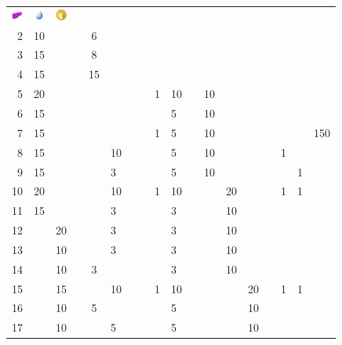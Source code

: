 \begin{table}[t]
\begin{center}
\begin{tabular}{r|g c g c g c g c g c g c g c g c g}
  \includegraphics[width=1em]{images/lure.png} &
  \includegraphics[width=1em]{images/luckyegg.png} &
  \includegraphics[width=1em]{images/pokecoin.png}
    \\
    2 & 10 &    &    &  6 &    &    &    &   &    &    &    &    &    &    &   &   & \\
    3 & 15 &    &    &  8 &    &    &    &   &    &    &    &    &    &    &   &   & \\
    4 & 15 &    &    & 15 &    &    &    &   &    &    &    &    &    &    &   &   & \\
    5 & 20 &    &    &    &    &    &    & 1 & 10 &    & 10 &    &    &    &   &   & \\
    6 & 15 &    &    &    &    &    &    &   &  5 &    & 10 &    &    &    &   &   & \\
    7 & 15 &    &    &    &    &    &    & 1 &  5 &    & 10 &    &    &    &   &   & 150 \\
    8 & 15 &    &    &    & 10 &    &    &   &  5 &    & 10 &    &    &    & 1 &   & \\
    9 & 15 &    &    &    &  3 &    &    &   &  5 &    & 10 &    &    &    &   & 1 & \\
   10 & 20 &    &    &    & 10 &    &    & 1 & 10 &    &    & 20 &    &    & 1 & 1 & \\
   11 & 15 &    &    &    &  3 &    &    &   &  3 &    &    & 10 &    &    &   &   & \\
   12 &    & 20 &    &    &  3 &    &    &   &  3 &    &    & 10 &    &    &   &   & \\
   13 &    & 10 &    &    &  3 &    &    &   &  3 &    &    & 10 &    &    &   &   & \\
   14 &    & 10 &    &  3 &    &    &    &   &  3 &    &    & 10 &    &    &   &   & \\
   15 &    & 15 &    &    & 10 &    &    & 1 & 10 &    &    &    & 20 &    & 1 & 1 & \\
   16 &    & 10 &    &  5 &    &    &    &   &  5 &    &    &    & 10 &    &   &   & \\
   17 &    & 10 &    &    &  5 &    &    &   &  5 &    &    &    & 10 &    &   &   & \\

\end{tabular}
\end{center}
\end{table}
